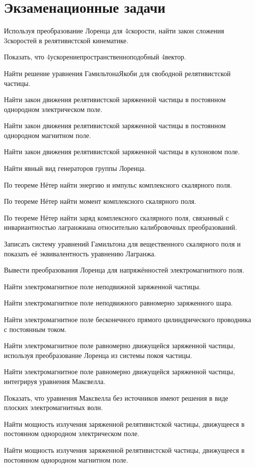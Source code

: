 \documentclass[a4paper,draft]{article}
\begin{document}
\medskip\dmvntrail

\pagebreak

\section*{Экзаменационные задачи}

\begin{nums}{-2}
\item Используя преобразование Лоренца для 4\д скорости, найти закон сложения 3\д скоростей в релятивистской кинематике.
\item Показать, что 4\д ускорение\т пространственноподобный 4\д вектор.
\item Найти решение уравнения Гамильтона\ч Якоби для свободной релятивистской частицы.
\item Найти закон движения релятивистской заряженной частицы в постоянном однородном электрическом поле.
\item Найти закон движения релятивистской заряженной частицы в постоянном однородном магнитном поле.
\item Найти закон движения релятивистской заряженной частицы в кулоновом поле.
\item Найти явный вид генераторов группы Лоренца.
\item По теореме Нётер найти энергию и импульс комплексного скалярного поля.
\item По теореме Нётер найти момент комплексного скалярного поля.
\item По теореме Нётер найти заряд комплексного скалярного поля, связанный с инвариантностью
      лагранжиана относительно калибровочных преобразований.
\item Записать систему уравнений Гамильтона для вещественного скалярного поля и показать
      её эквивалентность уравнению Лагранжа.
\item Вывести преобразования Лоренца для напряжённостей электромагнитного поля.
\item Найти электромагнитное поле неподвижной заряженной частицы.
\item Найти электромагнитное поле неподвижного равномерно заряженного шара.
\item Найти электромагнитное поле бесконечного прямого цилиндрического проводника с постоянным током.
\item Найти электромагнитное поле равномерно движущейся заряженной частицы, используя  преобразование Лоренца
      из системы покоя частицы.
\item Найти электромагнитное поле равномерно движущейся заряженной частицы, интегрируя уравнения Максвелла.
\item Показать, что уравнения Максвелла без источников имеют решения в виде плоских электромагнитных волн.
\item Найти мощность излучения заряженной релятивистской частицы, движущееся в постоянном однородном электрическом поле.
\item Найти мощность излучения заряженной релятивистской частицы, движущееся в постоянном однородном магнитном поле.
\end{nums}


\medskip\dmvntrail
\end{document}
